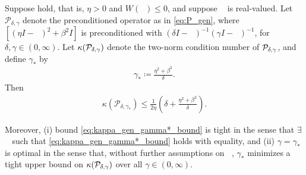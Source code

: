 \documentclass[review]{siamart}
\DeclareMathOperator{\cL}{\widehat{\mathcal{L}}}
\begin{document}
%
\begin{theorem}\label{th:cond}
Suppose  hold, that is, $\eta > 0$ and $W(\cL) \leq 0$,
and suppose $\cL$ is real-valued. Let $\mathcal{P}_{\delta,\gamma}$ denote
the preconditioned operator as in \eqref{eq:P_gen},
where $[(\eta I  - \cL)^2 + \beta^2 I]$ is preconditioned with
$(\delta I - \cL)^{-1} (\gamma I - \cL)^{-1}$, for $\delta, \gamma \in (0, \infty)$.
%
Let $\kappa({\cal P}_{\delta, \gamma})$ denote the two-norm condition number of ${\cal P}_{\delta,\gamma}$,
and define $\gamma_*$ by
\begin{align} \label{eq:gamma*_gen}
\gamma_* \coloneqq \frac{\eta^2+\beta^2}{\delta}.
\end{align}
Then
\begin{align} \label{eq:kappa_gen_gamma*_bound}
\kappa(\mathcal{P}_{\delta, \gamma_*}) \leq \frac{1}{2 \eta} \left( \delta + \frac{\eta^2 + \beta^2}{\delta} \right).
\end{align}

Moreover, (i) bound \eqref{eq:kappa_gen_gamma*_bound} is tight in the sense that $\exists$ $\cL$
such that \eqref{eq:kappa_gen_gamma*_bound} holds with equality, and (ii) $\gamma = \gamma_*$ is optimal
in the sense that, without further assumptions on $\cL$, $\gamma_*$ minimizes a tight
upper bound on $\kappa({\cal P}_{\delta, \gamma})$ over all $\gamma \in (0, \infty)$.
\end{theorem}
%
\end{document}
